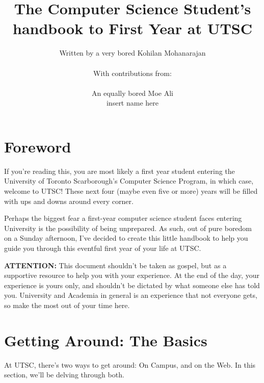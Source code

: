 \documentclass[11pt]{article}
\title{The Computer Science Student's handbook to First Year at UTSC}
\author{Written by a very bored Kohilan Mohanarajan \\ \\ {\small With contributions from:} \\ \\ {\footnotesize An equally bored Moe Ali} \\ {\footnotesize insert name here}}
\begin{document}
\maketitle
\newpage
\tableofcontents
\newpage
\section{Foreword}

If you're reading this, you are most likely a first year student entering the University of Toronto Scarborough's Computer Science Program, in which case, welcome to UTSC!  These next four (maybe even five or more) years will be filled with ups and downs around every corner.\par
Perhaps the biggest fear a first-year computer science student faces entering University is the possibility of being unprepared.  As such, out of pure boredom on a Sunday afternoon, I've decided to create this little handbook to help you guide you through this eventful first year of your life at UTSC.\par
\textbf{ATTENTION:} This document shouldn't be taken as gospel, but as a supportive resource to help you with your experience.  At the end of the day, your experience is yours only, and shouldn't be dictated by what someone else has told you.  University and Academia in general is an experience that not everyone gets, so make the most out of your time here.

\section{Getting Around: The Basics}

At UTSC, there's two ways to get around: On Campus, and on the Web. In this section, we'll be delving through both.
\end{document}
